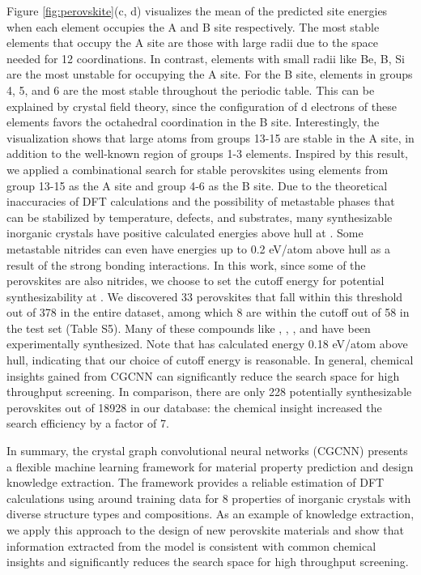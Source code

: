 \documentclass[twocolumn, prl]{revtex4-1}
\begin{document}
Figure \ref{fig:perovskite}(c, d) visualizes the mean of the predicted site energies when each element occupies the A and B site respectively. The most stable elements that occupy the A site are those with large radii due to the space needed for 12 coordinations. In contrast, elements with small radii like Be, B, Si are the most unstable for occupying the A site. For the B site, elements in groups 4, 5, and 6 are the most stable throughout the periodic table. This can be explained by crystal field theory, since the configuration of d electrons of these elements favors the octahedral coordination in the B site. Interestingly, the visualization shows that large atoms from groups 13-15 are stable in the A site, in addition to the well-known region of groups 1-3 elements. Inspired by this result, we applied a combinational search for stable perovskites using elements from group 13-15 as the A site and group 4-6 as the B site. Due to the theoretical inaccuracies of DFT calculations and the possibility of metastable phases that can be stabilized by temperature, defects, and substrates, many synthesizable inorganic crystals have positive calculated energies above hull at . Some metastable nitrides can even have energies up to 0.2 eV/atom above hull as a result of the strong bonding interactions\cite{sun2016thermodynamic}. In this work, since some of the perovskites are also nitrides, we choose to set the cutoff energy for potential synthesizability at . We discovered 33 perovskites that fall within this threshold out of 378 in the entire dataset, among which 8 are within the cutoff out of 58 in the test set (Table S5). Many of these compounds like \cite{shirane1952phase}, \cite{shirane1952phase}, \cite{lang2016improved}, and \cite{takatsu2017cubic} have been experimentally synthesized. Note that  has calculated energy 0.18 eV/atom above hull, indicating that our choice of cutoff energy is reasonable. In general, chemical insights gained from CGCNN can significantly reduce the search space for high throughput screening. In comparison, there are only 228 potentially synthesizable perovskites out of 18928 in our database: the chemical insight increased the search efficiency by a factor of 7.

In summary, the crystal graph convolutional neural networks (CGCNN) presents a flexible machine learning framework for material property prediction and design knowledge extraction. The framework provides a reliable estimation of DFT calculations using around  training data for 8 properties of inorganic crystals with diverse structure types and compositions. As an example of knowledge extraction, we apply this approach to the design of new perovskite materials and show that information extracted from the model is consistent with common chemical insights and significantly reduces the search space for high throughput screening. 
\end{document}
